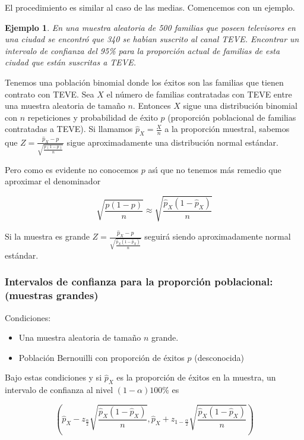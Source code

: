 \documentclass[12pt]{report}
\newtheorem{example}[definition]{Ejemplo}
\begin{document}
El procedimiento  es similar al caso de las medias. Comencemos con un ejemplo.

\begin{example}
En una muestra aleatoria  de 500 familias que poseen televisores en una ciudad se encontr\'o
que 340 se hab\'{\i}an suscrito al canal TEVE. Encontrar un intervalo de confianza del 95\% para
la proporci\'on  actual de familias de esta ciudad que est\'an suscritas a TEVE.
\end{example}

Tenemos una poblaci\'on binomial donde los \'exitos son las familias que tienen contrato con
TEVE. Sea $X$ el n\'umero de familias contratadas con TEVE entre una muestra aleatoria de
tama\~{n}o $n$. Entonces $X$ sigue una distribuci\'on binomial con $n$ repeticiones y
probabilidad de \'exito $p$
 (proporci\'on poblacional de familias contratadas a TEVE).
Si llamamos $\hat{p}_{X}=\frac{X}{n}$ a la proporci\'on muestral, sabemos que
$Z=\frac{\hat{p}_{X}-p}{\sqrt{\frac{p(1-p)}{n}}}$ sigue aproximadamente una distribuci\'on
normal est\'andar.

Pero como es evidente no conocemos $p$ as\'{\i} que no tenemos m\'as remedio que  aproximar el
denominador

$$\sqrt{\frac{p(1-p)}{n}}\approx \sqrt{\frac{\hat{p}_{X}(1-\hat{p}_{X})}{n}}$$


Si la muestra es grande $Z=\frac{\hat{p}_{X}-p}
{\sqrt{\frac{\hat{p}_{X}(1-\hat{p}_{X})}{n}}}$ seguir\'a siendo aproximadamente normal
est\'andar.

\subsubsection{Intervalos de confianza para la proporci\'on
poblacional:(muestras grandes)}

Condiciones:
\begin{itemize}
\item Una muestra aleatoria de tama\~{n}o $n$ grande.
\item Poblaci\'on Bernouilli con proporci\'on de \'exitos $p$ (desconocida)
\end{itemize}

Bajo estas condiciones y si $\hat{p}_{X}$ es la proporci\'on de \'exitos en la muestra, un
intervalo de confianza al nivel $(1-\alpha)100\%$ es


$$\left(\hat{p}_{X}-z_{\frac{\alpha}{2}}\sqrt{\frac{\hat{p}_{X} (1-\hat{p}_{X})}{n}},
\hat{p}_{X}+z_{1-\frac{\alpha}{2}}\sqrt{\frac{\hat{p}_{X} (1-\hat{p}_{X})}{n}}\right)$$
\end{document}
